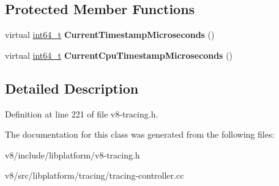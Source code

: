 \subsection*{Protected Member Functions}
\begin{DoxyCompactItemize}
\item 
\mbox{\label{classv8_1_1platform_1_1tracing_1_1TracingController_a7c5b3c6b875e85b61324d0aa12048a28}} 
virtual \mbox{\hyperlink{classint64__t}{int64\+\_\+t}} {\bfseries Current\+Timestamp\+Microseconds} ()
\item 
\mbox{\label{classv8_1_1platform_1_1tracing_1_1TracingController_a85900ffd45fea2bfca44971ba707c6c0}} 
virtual \mbox{\hyperlink{classint64__t}{int64\+\_\+t}} {\bfseries Current\+Cpu\+Timestamp\+Microseconds} ()
\end{DoxyCompactItemize}


\subsection{Detailed Description}


Definition at line 221 of file v8-\/tracing.\+h.



The documentation for this class was generated from the following files\+:\begin{DoxyCompactItemize}
\item 
v8/include/libplatform/v8-\/tracing.\+h\item 
v8/src/libplatform/tracing/tracing-\/controller.\+cc\end{DoxyCompactItemize}
